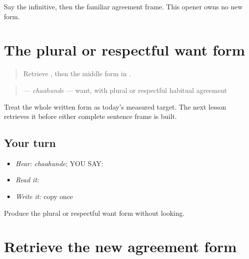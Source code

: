 \begin{tcolorbox}[breakable,colback=teal!4,colframe=teal!35!black,title={Before you move on}]
Say the infinitive, then the familiar agreement frame. This opener owns no new form.
\end{tcolorbox}
\section[\texorpdfstring{\pa{ਚਾਹੁੰਦੇ} (chaahunde)}{ਚਾਹੁੰਦੇ (chaahunde)}]{The plural or respectful want form}

\label{lesson:PA-C189-chahunde}



\begin{quote}
Retrieve \textbf{}, then the middle form in \textbf{   }.
\end{quote}

\begin{grammarlens}[title={Grammar Lens: direct owner}]
\begin{quote}
\textbf{} — \emph{chaahunde} — want, with plural or respectful habitual agreement
\end{quote}

Treat the whole written form as today’s measured target. The next lesson retrieves it before either complete sentence frame is built.
\end{grammarlens}

\subsection*{Your turn}
\begin{itemize}
\raggedright
  \item \emph{Hear:} \emph{chaahunde}; YOU SAY: \textbf{}
  \item \emph{Read it:} \textbf{}
  \item \emph{Write it:} copy \textbf{} once
\end{itemize}

\begin{tcolorbox}[breakable,colback=teal!4,colframe=teal!35!black,title={Before you move on}]
Produce the plural or respectful want form without looking.
\end{tcolorbox}
\section[\texorpdfstring{\pa{ਚਾਹੁੰਦੇ} (chaahunde)}{ਚਾਹੁੰਦੇ (chaahunde)}]{Retrieve the new agreement form}


